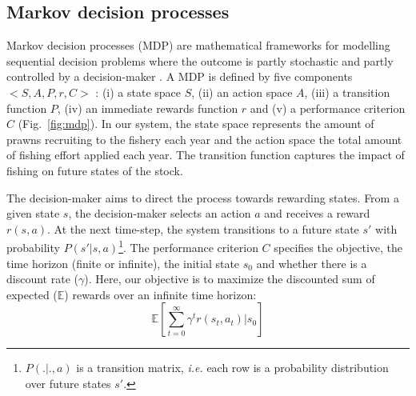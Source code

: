 


%



\subsection{Markov decision processes}

Markov decision processes (MDP) are mathematical frameworks for modelling sequential decision problems where the outcome is partly stochastic and partly controlled by a decision-maker \citep{bellman_dynamic_1957}. A MDP is defined by five components $< S, A, P, r, C >$ \citep{puterman_markov_1994} : (i) a state space $S$, (ii) an action space $A$, (iii) a transition function $P$, (iv) an immediate rewards function $r$ and (v) a performance criterion $C$ (Fig.~\ref{fig:mdp}). In our system, the state space represents the amount of prawns recruiting to the fishery each year and the action space the total amount of fishing effort applied each year. The transition function captures the impact of fishing on future states of the stock.

The decision-maker aims to direct the process towards rewarding states. From a given state $s$, the decision-maker selects an action $a$ and receives a reward $r(s,a)$. At the next time-step, the system transitions to a future state $s'$ with probability $P(s'|s,a)$\footnote{$P(.|.,a)$ is a transition matrix, {\it i.e.} each row is a probability distribution over future states $s'$.}. The performance criterion $C$ specifies the objective, the time horizon (finite or infinite), the initial state $s_0$ and whether there is a discount rate ($\gamma$). Here, our objective is to maximize the discounted sum of expected ($\mathbb{E}$) rewards over an infinite time horizon: 
\begin{equation}
\mathbb{E}[\sum\limits_{t=0}^\infty \gamma^t r(s_t,a_t)|s_0]
\end{equation}


